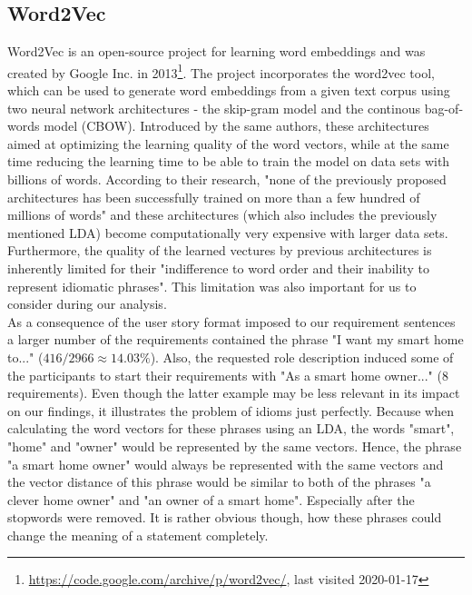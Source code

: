 \subsection{Word2Vec} %
\label{sub:word_2_vec}
Word2Vec is an open-source project for learning word embeddings and was created by Google Inc. in 2013\footnote{\label{word2vec_link}\url{https://code.google.com/archive/p/word2vec/}, last visited 2020-01-17}. The project incorporates the word2vec tool, which can be used to generate word embeddings from a given text corpus using two neural network architectures - the skip-gram model and the continous bag-of-words model (CBOW). Introduced by the same authors, these architectures aimed at optimizing the learning quality of the word vectors, while at the same time reducing the learning time to be able to train the model on data sets with billions of words\cite{mikolov_efficient_2013}. According to their research, "none of the previously proposed architectures has been successfully trained on more than a few hundred of millions of words"\cite[p1]{mikolov_efficient_2013} and these architectures (which also includes the previously mentioned LDA) become computationally very expensive with larger data sets. Furthermore, the quality of the learned vectures by previous architectures is inherently limited for their "indifference to word order and their inability to represent idiomatic phrases"\cite[p1]{mikolov_distributed_2013}. This limitation was also important for us to consider during our analysis.\\
As a consequence of the user story format imposed to our requirement sentences a larger number of the requirements contained the phrase "I want my smart home to..." ($416 / 2966 \approx14.03\%$). Also, the requested role description induced some of the participants to start their requirements with "As a smart home owner..." (8 requirements). Even though the latter example may be less relevant in its impact on our findings, it illustrates the problem of idioms just perfectly. Because when calculating the word vectors for these phrases using an LDA, the words "smart", "home" and "owner" would be represented by the same vectors. Hence, the phrase "a smart home owner" would always be represented with the same vectors and the vector distance of this phrase would be similar to both of the phrases "a clever home owner" and "an owner of a smart home". Especially after the stopwords were removed. It is rather obvious though, how these phrases could change the meaning of a statement completely.\\
